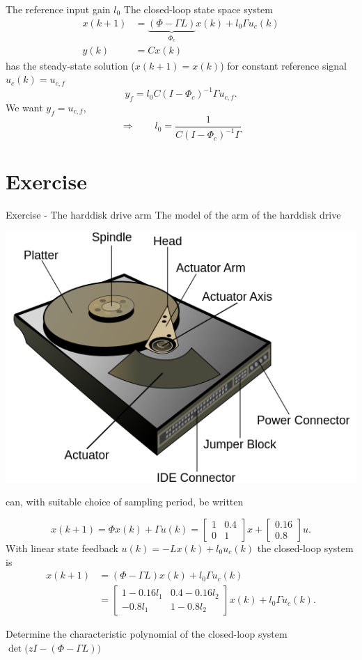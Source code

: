 \documentclass[presentation,aspectratio=1610]{beamer}
\begin{document}
\begin{frame}[label={sec:orgd8f4570}]{The reference input gain \(l_0\)}
The closed-loop state space system
\begin{equation*}
\begin{split}
 x(k+1) &= \underbrace{\left(\Phi -\Gamma L \right)}_{\Phi_c} x(k) + l_0\Gamma u_c(k)\\
 y(k) &= C x(k)
\end{split}
\end{equation*}
has the steady-state solution (\(x(k+1)=x(k)\)) for constant reference signal \(u_c(k) = u_{c,f}\)
\[ y_f = l_0 C(I - \Phi_c)^{-1}\Gamma u_{c,f}.\]
We want \(y_f =  u_{c,f}\),
\[ \Rightarrow \qquad l_0 = \frac{1}{C(I-\Phi_c)^{-1}\Gamma}\]
\end{frame}

\section{Exercise}
\label{sec:org5a40279}

\begin{frame}[label={sec:orga7a2e33}]{Exercise - The harddisk drive arm}
\footnotesize
The model of the arm of the harddisk drive
\begin{center}
\includegraphics[width=0.2\linewidth]{../../figures/hard-drive.png}
\end{center}
can, with suitable choice of sampling period, be written

\[x(k+1) = \Phi x(k) + \Gamma u(k) = \begin{bmatrix} 1 & 0.4\\ 0 &1 \end{bmatrix} x + \begin{bmatrix}0.16\\0.8\end{bmatrix}u.\]
With linear state feedback \(u(k) = -Lx(k) + l_0u_c(k)\) the closed-loop system is
\begin{equation*}
   \begin{split}
    x(k+1) &= \left(\Phi -\Gamma L \right) x(k) + l_0\Gamma u_c(k)\\
           &= \begin{bmatrix} 1-0.16l_1 & 0.4 - 0.16l_2\\-0.8l_1 & 1-0.8l_2\end{bmatrix} x(k) + l_0\Gamma u_c(k).
   \end{split}
\end{equation*}

\alert{Determine} the characteristic polynomial of the closed-loop system \(\det \Big( zI - (\Phi - \Gamma L)\Big)\)
\end{frame}
\end{document}
